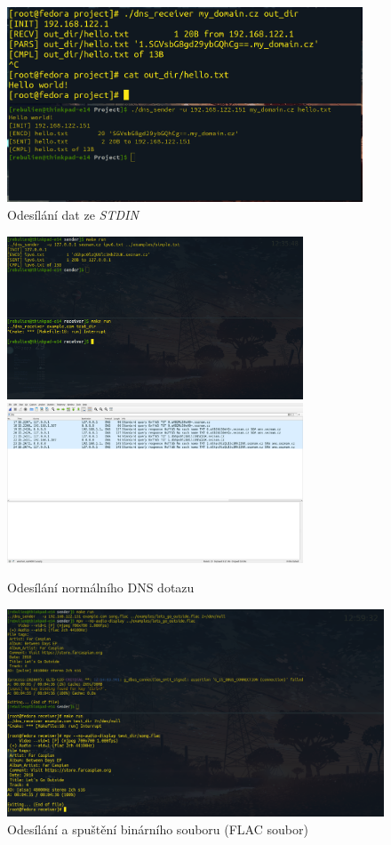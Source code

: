 \documentclass[a4paper,11pt]{article}
\begin{document}
    \noindent
    \begin{figure}[h]
        \centering
        \includegraphics[width=300pt]{simple_text}
        \caption{Odesílání dat ze \emph{STDIN}}
    \end{figure}
    \noindent
    \begin{figure}[h]
        \centering
        \includegraphics[width=250pt]{normal_query}
        \includegraphics[width=250pt]{wireshark}
        \caption{Odesílání normálního DNS dotazu}
    \end{figure}
    \noindent
    \begin{figure}[h]
        \centering
        \includegraphics[width=\textwidth]{send_flac_file.png}
        \caption{Odesílání a spuštění binárního souboru (FLAC soubor)}
    \end{figure}
    \clearpage

    
    \renewcommand{\refname}{Literatura}
    
    \nocite{ComputerNetworking}
    \nocite{SocketProgramming}
\end{document}
